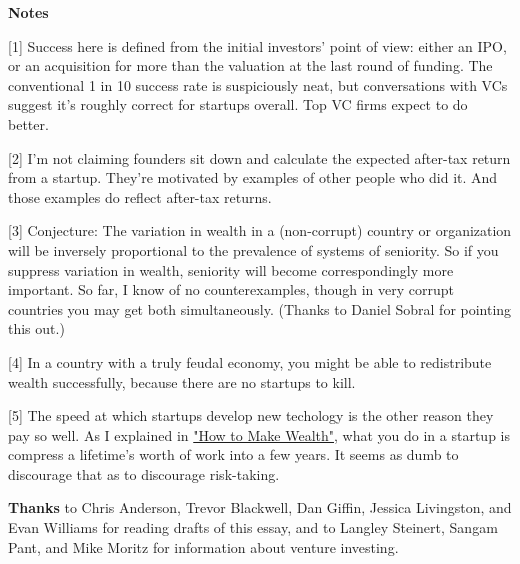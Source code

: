 \textbf{Notes}


                  [1] Success here is defined from the initial investors' point
                  of view: either an IPO, or an acquisition for more than the
                  valuation at the last round of funding. The conventional 1 in
                  10 success rate is suspiciously neat, but conversations with
                  VCs suggest it's roughly correct for startups overall. Top VC
                  firms expect to do better.

[2] I'm not claiming founders sit down and calculate the
                  expected after-tax return from a startup. They're motivated by
                  examples of other people who did it. And those examples do
                  reflect after-tax returns.

[3] Conjecture: The variation in wealth in a (non-corrupt)
                  country or organization will be inversely proportional to the
                  prevalence of systems of seniority. So if you suppress
                  variation in wealth, seniority will become correspondingly
                  more important. So far, I know of no counterexamples, though
                  in very corrupt countries you may get both simultaneously.
                  (Thanks to Daniel Sobral for pointing this out.)

[4] In a country with a truly feudal economy, you might be able
                  to redistribute wealth successfully, because there are no
                  startups to kill.

[5] The speed at which startups develop new techology is the
                  other reason they pay so well. As I explained in
                  \href{http://www.paulgraham.com/wealth.html}{"How to Make Wealth"}, what you do in
                  a startup is compress a lifetime's worth of work into a few
                  years. It seems as dumb to discourage that as to discourage
                  risk-taking.


                  \textbf{Thanks} to Chris Anderson, Trevor Blackwell, Dan Giffin,
                  Jessica Livingston, and Evan Williams for reading drafts of
                  this essay, and to Langley Steinert, Sangam Pant, and Mike
                  Moritz for information about venture investing.


              
            
          
